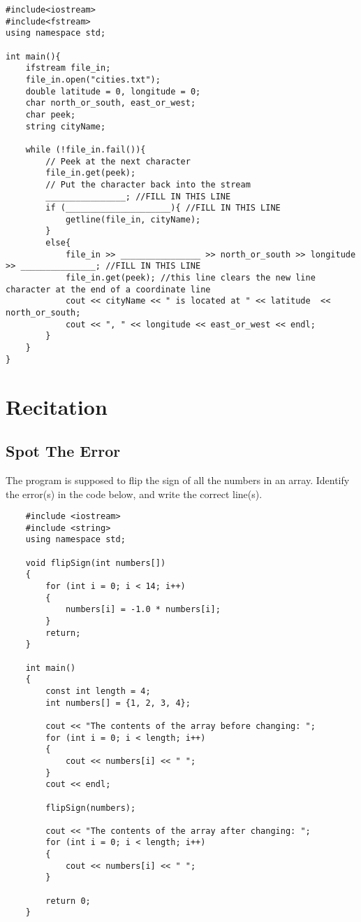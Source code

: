 \begin{verbatim}
#include<iostream>
#include<fstream>
using namespace std;

int main(){
    ifstream file_in;
    file_in.open("cities.txt");
    double latitude = 0, longitude = 0;
    char north_or_south, east_or_west;
    char peek;
    string cityName;

    while (!file_in.fail()){
        // Peek at the next character
        file_in.get(peek);
        // Put the character back into the stream
        ________________; //FILL IN THIS LINE
        if (_____________________){ //FILL IN THIS LINE
            getline(file_in, cityName);
        }
        else{
            file_in >> ________________ >> north_or_south >> longitude >> _______________; //FILL IN THIS LINE
            file_in.get(peek); //this line clears the new line character at the end of a coordinate line
            cout << cityName << " is located at " << latitude  << north_or_south;
            cout << ", " << longitude << east_or_west << endl;
        }
    }
}

\end{verbatim}

\section{Recitation}

\subsection{Spot The Error}
\begin{multipart}
The program is supposed to flip the sign of all the numbers in an array. Identify the error(s) in the code below, and write the correct line(s).
\end{multipart}

\begin{verbatim}
    #include <iostream>
    #include <string>
    using namespace std;
    
    void flipSign(int numbers[]) 
    {
        for (int i = 0; i < 14; i++) 
        {
            numbers[i] = -1.0 * numbers[i];
        }
        return;
    }
    
    int main()
    {
        const int length = 4;
        int numbers[] = {1, 2, 3, 4};
    
        cout << "The contents of the array before changing: ";
        for (int i = 0; i < length; i++)
        {
            cout << numbers[i] << " ";
        }
        cout << endl;
    
        flipSign(numbers);
    
        cout << "The contents of the array after changing: ";
        for (int i = 0; i < length; i++)
        {
            cout << numbers[i] << " ";
        }
    
        return 0;
    }
\end{verbatim}

